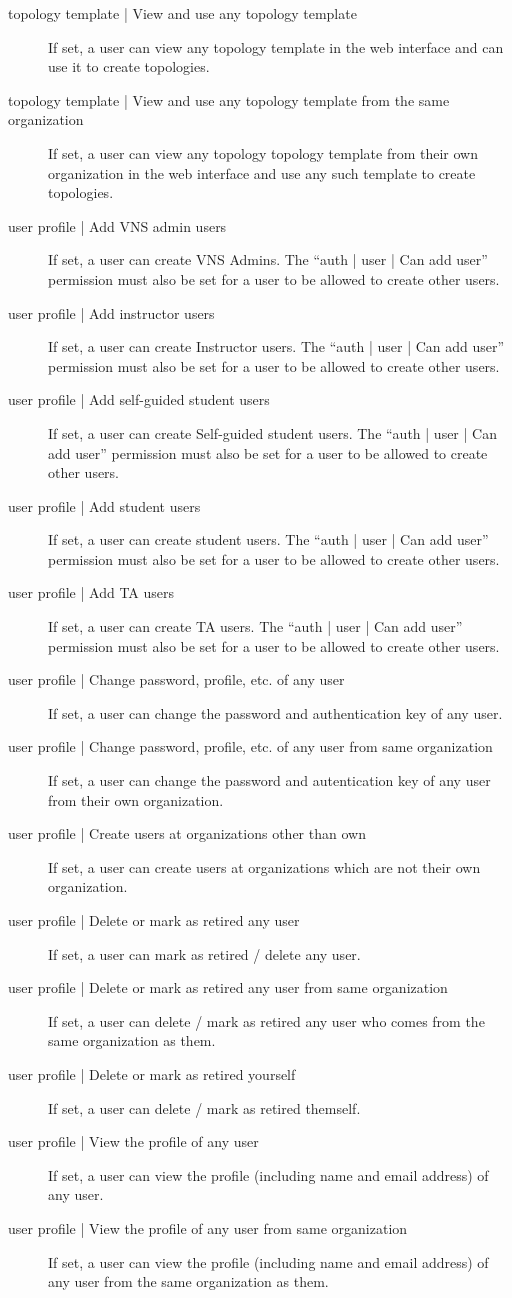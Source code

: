 \documentclass[a4paper,12pt]{report}
\begin{document}
\begin{description}
\item[topology template | View and use any topology template]  If set, a user can view any topology template in the web interface and can use it to create topologies.
\item[topology template | View and use any topology template from the same organization]  If set, a user can view any topology topology template from their own organization in the web interface and use any such template to create topologies.
\item[user profile | Add VNS admin users]  If set, a user can create VNS Admins.  The ``auth | user | Can add user'' permission must also be set for a user to be allowed to create other users.
\item[user profile | Add instructor users]  If set, a user can create Instructor users.  The ``auth | user | Can add user'' permission must also be set for a user to be allowed to create other users.
\item[user profile | Add self-guided student users]  If set, a user can create Self-guided student users.  The ``auth | user | Can add user'' permission must also be set for a user to be allowed to create other users.
\item[user profile | Add student users]  If set, a user can create student users.  The ``auth | user | Can add user'' permission must also be set for a user to be allowed to create other users.
\item[user profile | Add TA users]  If set, a user can create TA users.  The ``auth | user | Can add user'' permission must also be set for a user to be allowed to create other users.
\item[user profile | Change password, profile, etc. of any user]  If set, a user can change the password and authentication key of any user.
\item[user profile | Change password, profile, etc. of any user from same organization]  If set, a user can change the password and autentication key of any user from their own organization.
\item[user profile | Create users at organizations other than own]  If set, a user can create users at organizations which are not their own organization.
\item[user profile | Delete or mark as retired any user]  If set, a user can mark as retired / delete any user.
\item[user profile | Delete or mark as retired any user from same organization]  If set, a user can delete / mark as retired any user who comes from the same organization as them.
\item[user profile | Delete or mark as retired yourself]  If set, a user can delete / mark as retired themself.
\item[user profile | View the profile of any user]  If set, a user can view the profile (including name and email address) of any user.
\item[user profile | View the profile of any user from same organization]  If set, a user can view the profile (including name and email address) of any user from the same organization as them.
\end{description}
\end{document}
